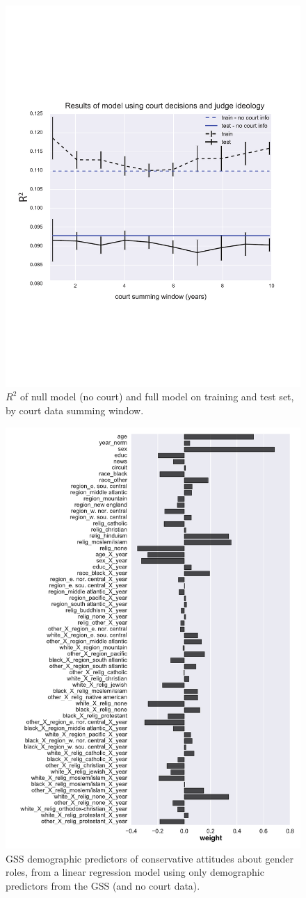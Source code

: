 \documentclass{article}
\begin{document}
\begin{figure}[h!]
\begin{center}
\includegraphics[width=0.7\columnwidth]{figures/summing_windows/summing_windows}
\caption{\(R^2\) of null model (no court) and full model on
training and test set, by court data summing window.%
}
\end{center}
\end{figure}

\begin{figure}[h!]
\begin{center}
\includegraphics[width=0.7\columnwidth]{figures/coefficients_nocourt1/coefficients_nocourt.pdf}
\caption{GSS demographic predictors of conservative attitudes about
gender roles, from a linear regression model using only demographic
predictors from the GSS (and no court data).%
}
\end{center}
\end{figure}
\end{document}
